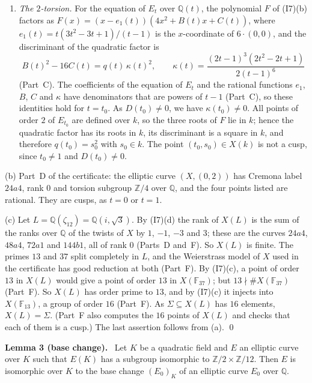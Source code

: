 \documentclass[11pt]{article}
\newenvironment{statement}[1]{\par\medskip\noindent\phantomsection\textbf{#1}\ }{\par\medskip}
\newcommand{\Q}{\mathbb Q}
\newcommand{\Z}{\mathbb Z}
\newcommand{\F}{\mathbb F}
\begin{document}
\begin{enumerate}
\item \emph{The \(2\)-torsion.} For the equation of \(E_t\) over \(\Q(t)\), the polynomial \(F\) of (I7)(b)
factors as \(F(x)=(x-e_1(t))(4x^2+B(t)x+C(t))\), where \(e_1(t)=t(3t^2-3t+1)/(t-1)\) is the \(x\)-coordinate of
\(6\cdot(0,0)\), and the discriminant of the quadratic factor is
\[B(t)^2-16C(t)=q(t)\,\kappa(t)^2,\qquad\kappa(t)=\frac{(2t-1)^3(2t^2-2t+1)}{2(t-1)^6}\]
(Part~C). The coefficients of the equation of \(E_t\) and the rational functions \(e_1\), \(B\), \(C\) and
\(\kappa\) have denominators that are powers of \(t-1\) (Part~C), so these identities hold for \(t=t_0\). As
\(D(t_0)\neq0\), we have \(\kappa(t_0)\neq0\). All points of order \(2\) of \(E_{t_0}\) are defined over \(k\), so
the three roots of \(F\) lie in \(k\); hence the quadratic factor has its roots in \(k\), its discriminant is a
square in \(k\), and therefore \(q(t_0)=s_0^2\) with \(s_0\in k\). The point \((t_0,s_0)\in X(k)\) is not a cusp,
since \(t_0\neq1\) and \(D(t_0)\neq0\).
\end{enumerate}

(b) Part~D of the certificate: the elliptic curve \((X,(0,2))\) has Cremona label \(24a4\), rank \(0\) and torsion
subgroup \(\Z/4\) over \(\Q\), and the four points listed are rational. They are cusps, as \(t=0\) or \(t=1\).

(c) Let \(L=\Q(\zeta_{12})=\Q(i,\sqrt3)\). By (I7)(d) the rank of \(X(L)\) is the sum of the ranks over \(\Q\) of
the twists of \(X\) by \(1\), \(-1\), \(-3\) and \(3\); these are the curves \(24a4\), \(48a4\), \(72a1\) and
\(144b1\), all of rank \(0\) (Parts~D and~F). So \(X(L)\) is finite. The primes \(13\) and \(37\) split completely
in \(L\), and the Weierstrass model of \(X\) used in the certificate has good reduction at both (Part~F). By (I7)(c), a point of order \(13\) in \(X(L)\) would give a point
of order \(13\) in \(X(\F_{37})\); but \(13\nmid\#X(\F_{37})\) (Part~F). So \(X(L)\) has order prime to \(13\), and
by (I7)(c) it injects into \(X(\F_{13})\), a group of order \(16\) (Part~F). As \(\Sigma\subseteq X(L)\) has
\(16\) elements, \(X(L)=\Sigma\). (Part~F also computes the \(16\) points of \(X(L)\) and checks that each of them
is a cusp.) The last assertion follows from (a). \qed

\begin{statement}{Lemma 3 (base change).}\label{lemma-basechange}
Let \(K\) be a quadratic field and \(E\) an elliptic curve over \(K\) such that \(E(K)\) has a subgroup isomorphic
to \(\Z/2\times\Z/12\). Then \(E\) is isomorphic over \(K\) to the base change \((E_0)_K\) of an elliptic curve
\(E_0\) over \(\Q\).
\end{statement}
\end{document}
